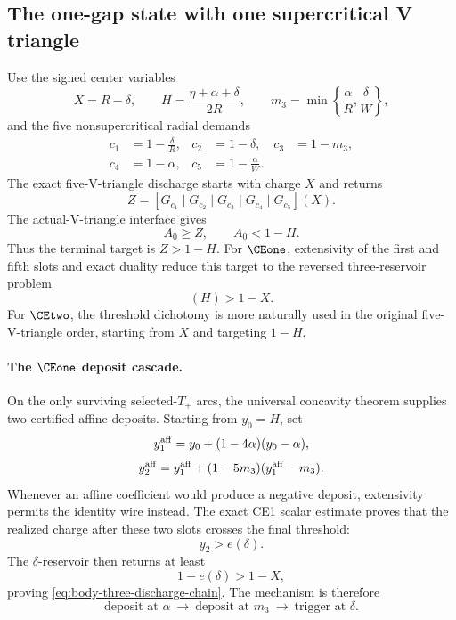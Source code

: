 \subsection{The one-gap state with one supercritical V triangle}

Use the signed center variables
\[
 X=R-\delta,
 \qquad
 H=\frac{\eta+\alpha+\delta}{2R},
 \qquad
 m_3=\min\left\{\frac\alpha R,\frac\delta W\right\},
\]
and the five nonsupercritical radial demands
\[
 \begin{aligned}
 c_1&=1-\frac\delta R,&c_2&=1-\delta,&c_3&=1-m_3,\\
 c_4&=1-\alpha,&c_5&=1-\frac\alpha W.
 \end{aligned}
\]
The exact five-V-triangle discharge starts with charge \(X\) and returns
\begin{equation}
 Z=[G_{c_1}\mid G_{c_2}\mid G_{c_3}\mid G_{c_4}\mid G_{c_5}](X).
 \label{eq:body-five-discharge-chain}
\end{equation}
The actual-V-triangle interface gives
\[
 A_0\ge Z,
 \qquad
 A_0<1-H.
\]
Thus the terminal target is \(Z>1-H\).  For \(\CEone\), extensivity of
the first and fifth slots and exact duality reduce this target to the reversed
three-reservoir problem
\begin{equation}
 [G_{1-\alpha}\mid G_{1-m_3}\mid G_{1-\delta}](H)>1-X.
 \label{eq:body-three-discharge-chain}
\end{equation}
For \(\CEtwo\), the threshold dichotomy is more naturally used in the
original five-V-triangle order, starting from \(X\) and targeting
\(1-H\).

\paragraph{The \(\CEone\) deposit cascade.}
On the only surviving selected-\(T_+\) arcs, the universal concavity theorem
supplies two certified affine deposits.  Starting from \(y_0=H\), set
\[
 y_1^{\rm aff}=y_0+(1-4\alpha)(y_0-\alpha),
\]
\[
 y_2^{\rm aff}
 =y_1^{\rm aff}+(1-5m_3)(y_1^{\rm aff}-m_3).
\]
Whenever an affine coefficient would produce a negative deposit, extensivity
permits the identity wire instead.  The exact CE1 scalar estimate proves that
the realized charge after these two slots crosses the final threshold:
\[
 y_2>e(\delta).
\]
The \(\delta\)-reservoir then returns at least
\[
 1-e(\delta)>1-X,
\]
proving \eqref{eq:body-three-discharge-chain}.  The mechanism is therefore
\[
 \boxed{\text{deposit at }\alpha
 \ \longrightarrow\ \text{deposit at }m_3
 \ \longrightarrow\ \text{trigger at }\delta.}
\]

